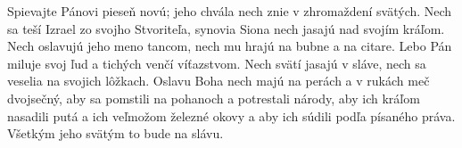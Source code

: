 Spievajte Pánovi pieseň novú;
jeho chvála nech znie v zhromaždení svätých.
\versseparator
Nech sa teší Izrael zo svojho Stvoriteľa,
synovia Siona nech jasajú nad svojím kráľom.
\versseparator
Nech oslavujú jeho meno tancom,
nech mu hrajú na bubne a na citare.
\versseparator
Lebo Pán miluje svoj ľud
a tichých venčí víťazstvom.
\versseparator
Nech svätí jasajú v sláve,
nech sa veselia na svojich lôžkach.
\versseparator
Oslavu Boha nech majú na perách
a v rukách meč dvojsečný,
\versseparator
aby sa pomstili na pohanoch
a potrestali národy,
\versseparator
aby ich kráľom nasadili putá
a ich veľmožom železné okovy
\versseparator
a aby ich súdili podľa písaného práva.
Všetkým jeho svätým to bude na slávu.
